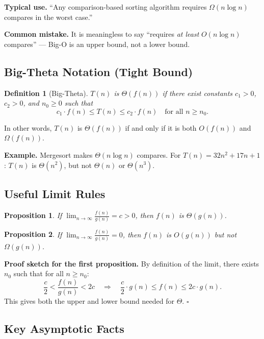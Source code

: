\documentclass[12pt,a4paper]{report}
\newtheorem{definition}{Definition}
\newtheorem{proposition}{Proposition}
\begin{document}
\textbf{Typical use.} ``Any comparison-based sorting algorithm requires $\Omega(n \log n)$
compares in the worst case.''

\medskip
\textbf{Common mistake.} It is meaningless to say ``requires \emph{at least} $O(n \log n)$
compares'' — Big-O is an upper bound, not a lower bound.

\subsection{Big-Theta Notation (Tight Bound)}

\begin{definition}[Big-Theta]
$T(n)$ is $\Theta(f(n))$ if there exist constants $c_1 > 0$, $c_2 > 0$, and $n_0 \geq 0$
such that
\[
    c_1 \cdot f(n) \leq T(n) \leq c_2 \cdot f(n) \quad \text{for all } n \geq n_0.
\]
\end{definition}

In other words, $T(n)$ is $\Theta(f(n))$ if and only if it is both $O(f(n))$ and
$\Omega(f(n))$.

\textbf{Example.} Mergesort makes $\Theta(n \log n)$ compares. For
$T(n) = 32n^2 + 17n + 1$: $T(n)$ is $\Theta(n^2)$, but not $\Theta(n)$ or $\Theta(n^3)$.

\subsection{Useful Limit Rules}

\begin{proposition}
If $\displaystyle\lim_{n \to \infty} \frac{f(n)}{g(n)} = c > 0$, then $f(n)$ is $\Theta(g(n))$.
\end{proposition}

\begin{proposition}
If $\displaystyle\lim_{n \to \infty} \frac{f(n)}{g(n)} = 0$, then $f(n)$ is $O(g(n))$ but not $\Omega(g(n))$.
\end{proposition}

\textbf{Proof sketch for the first proposition.} By definition of the limit, there exists
$n_0$ such that for all $n \geq n_0$:
\[
    \frac{c}{2} < \frac{f(n)}{g(n)} < 2c
    \quad \Rightarrow \quad
    \frac{c}{2} \cdot g(n) \leq f(n) \leq 2c \cdot g(n).
\]
This gives both the upper and lower bound needed for $\Theta$. \hfill$\square$

\subsection{Key Asymptotic Facts}
\end{document}
